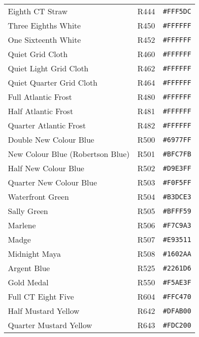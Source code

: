 \documentclass[a4paper]{article}
\begin{document}
\begin{longtable}{|l|l|r|}
Eighth CT Straw & R444 & \texttt{\#FFF5DC} \cellcolor[HTML]{FFF5DC} \\
Three Eighths White & R450 & \texttt{\#FFFFFF} \cellcolor[HTML]{FFFFFF} \\
One Sixteenth White & R452 & \texttt{\#FFFFFF} \cellcolor[HTML]{FFFFFF} \\
Quiet Grid Cloth & R460 & \texttt{\#FFFFFF} \cellcolor[HTML]{FFFFFF} \\
Quiet Light Grid Cloth & R462 & \texttt{\#FFFFFF} \cellcolor[HTML]{FFFFFF} \\
Quiet Quarter Grid Cloth & R464 & \texttt{\#FFFFFF} \cellcolor[HTML]{FFFFFF} \\
Full Atlantic Frost & R480 & \texttt{\#FFFFFF} \cellcolor[HTML]{FFFFFF} \\
Half Atlantic Frost & R481 & \texttt{\#FFFFFF} \cellcolor[HTML]{FFFFFF} \\
Quarter Atlantic Frost & R482 & \texttt{\#FFFFFF} \cellcolor[HTML]{FFFFFF} \\
Double New Colour Blue & R500 & \texttt{\#6977FF} \cellcolor[HTML]{6977FF} \\
New Colour Blue (Robertson Blue) & R501 & \texttt{\#BFC7FB} \cellcolor[HTML]{BFC7FB} \\
Half New Colour Blue & R502 & \texttt{\#D9E3FF} \cellcolor[HTML]{D9E3FF} \\
Quarter New Colour Blue & R503 & \texttt{\#F0F5FF} \cellcolor[HTML]{F0F5FF} \\
Waterfront Green & R504 & \texttt{\#B3DCE3} \cellcolor[HTML]{B3DCE3} \\
Sally Green & R505 & \texttt{\#BFFF59} \cellcolor[HTML]{BFFF59} \\
Marlene & R506 & \texttt{\#F7C9A3} \cellcolor[HTML]{F7C9A3} \\
Madge & R507 & \texttt{\#E93511} \cellcolor[HTML]{E93511} \\
Midnight Maya & R508 & \texttt{\#1602AA} \cellcolor[HTML]{1602AA} \\
Argent Blue & R525 & \texttt{\#2261D6} \cellcolor[HTML]{2261D6} \\
Gold Medal & R550 & \texttt{\#F5AE3F} \cellcolor[HTML]{F5AE3F} \\
Full CT Eight Five & R604 & \texttt{\#FFC470} \cellcolor[HTML]{FFC470} \\
Half Mustard Yellow & R642 & \texttt{\#DFAB00} \cellcolor[HTML]{DFAB00} \\
Quarter Mustard Yellow & R643 & \texttt{\#FDC200} \cellcolor[HTML]{FDC200} \\

\end{longtable}
\end{document}
